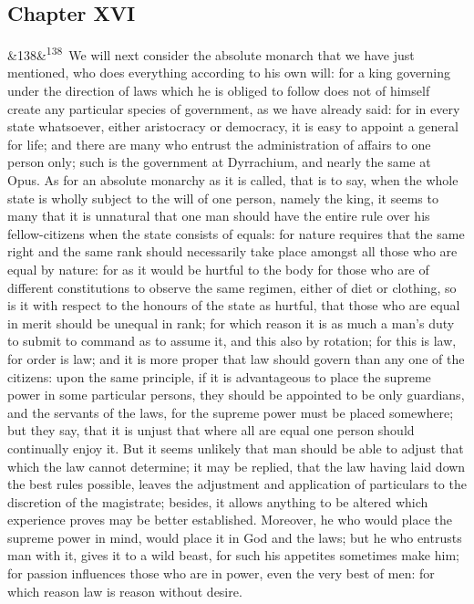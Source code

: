 \documentclass[12pt]{article}
\newcommand{\para}[1][]{\par\noindent\ifx&#1&\else\textsuperscript{\footnotesize #1}~\fi}
\begin{document}
\subsection*{Chapter XVI}

\para[138] [1287a] We will next consider the absolute monarch that we have just mentioned, who does everything according to his own will: for a king governing under the direction of laws which he is obliged to follow does not of himself create any particular species of government, as we have already said: for in every state whatsoever, either aristocracy or democracy, it is easy to appoint a general for life; and there are many who entrust the administration of affairs to one person only; such is the government at Dyrrachium, and nearly the same at Opus. As for an absolute monarchy as it is called, that is to say, when the whole state is wholly subject to the will of one person, namely the king, it seems to many that it is unnatural that one man should have the entire rule over his fellow-citizens when the state consists of equals: for nature requires that the same right and the same rank should necessarily take place amongst all those who are equal by nature: for as it would be hurtful to the body for those who are of different constitutions to observe the same regimen, either of diet or clothing, so is it with respect to the honours of the state as hurtful, that those who are equal in merit should be unequal in rank; for which reason it is as much a man's duty to submit to command as to assume it, and this also by rotation; for this is law, for order is law; and it is more proper that law should govern than any one of the citizens: upon the same principle, if it is advantageous to place the supreme power in some particular persons, they should be appointed to be only guardians, and the servants of the laws, for the supreme power must be placed somewhere; but they say, that it is unjust that where all are equal one person should continually enjoy it. But it seems unlikely that man should be able to adjust that which the law cannot determine; it may be replied, that the law having laid down the best rules possible, leaves the adjustment and application of particulars to the discretion of the magistrate; besides, it allows anything to be altered which experience proves may be better established. Moreover, he who would place the supreme power in mind, would place it in God and the laws; but he who entrusts man with it, gives it to a wild beast, for such his appetites sometimes make him; for passion influences those who are in power, even the very best of men: for which reason law is reason without desire.
\end{document}
